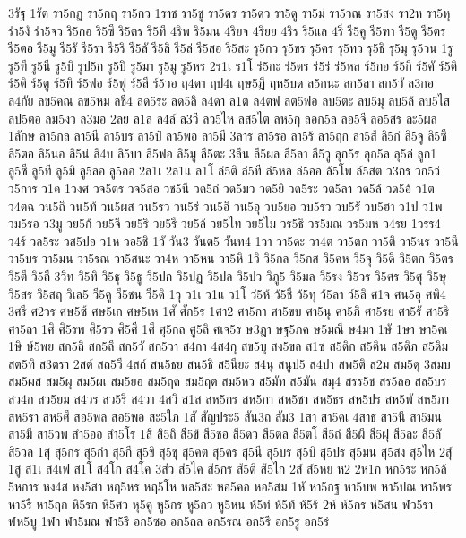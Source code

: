 {3รัฐ
1รัต
รา5กฏ
รา5กฤ
รา5กว
1ราช
รา5ชู
รา5ดร
รา5ดว
รา5ดู
รา5ม่
รา5วณ
รา5สง
รา2ห
รา5หุ
รำ5งั
รำ5จว
ริ5กอ
ริ5ซึ
ริ5ตร
ริ5ทึ
4ริพ
ริ5มน
4ริยจ
4ริยย
4ริร
ริ5แล
4ริ่
รี5คู
รี5ฑา
รี5ดู
รี5ตร
รี5ตอ
รี5มู
รี5รั
รี5รา
รี5ริ
รี5ลั
รี5ลิ
รี5ล่
รี5สอ
รี5สะ
รุ5กว
รุ5ขร
รุ5คร
รุ5ทว
รุ5ธิ
รุ5มุ
รุ5วน
1รู
รู5ที
รู5นี
รู5บิ
รูป5ก
รู5ปิ
รู5มา
รู5มู
รู5หร
2ร1เ
ร1โ
ร่5กะ
ร่5ตร
ร่5ร่
ร่5หล
ร์5กอ
ร์5กี
ร์5คั
ร์5ดิ
ร์5ติ
ร์5ตู
ร์5ทิ
ร์5ฟอ
ร์5ฟู
ร์5ลี
ร์5วอ
ฤ4ดา
ฤป4เ
ฤษ5ฎี
ฤห5บด
ล5กนะ
ลก5ลา
ลก5วั
ล3กอ
ล4กัย
ลข5คณ
ลข5หม
ลชี4
ลด5ระ
ลด5ลิ
ล4ดา
ล1ต
ล4ตฟ
ลต5ฟอ
ลบ5ตะ
ลบ5มุ
ลบ5ล้
ลบ5ไส
ลป5ตอ
ลม5งว
ล3มอ
2ลย
ล1ล
ล4ล์
ล3วี
ลว5ไห
ลส5ไต
ลห5กุ
ลอก5ล
ลอ5จี
ลอ5สร
ละ5ผล
1ลักษ
ลา5กล
ลา5นี
ลา5บร
ลา5ป๋
ลา5พอ
ลา5มี
3ลาร
ลา5รอ
ลา5ร้
ลา5ฤก
ลา5ส้
ลิ5ก่
ลิ5จู
ลิ5ซึ
ลิ5ตอ
ลิ5นอ
ลิ5น่
ลิ4บ
ลิ5บา
ลิ5ฟอ
ลิ5มู
ลี5ตะ
3ลีน
ลี5ผล
ลี5ลา
ลี5วู
ลุก5ร
ลุก5ล
ลุ5ล่
ลูก1
ลู5ซี
ลู5ที
ลู5มิ
ลู5ลอ
ลู5ออ
2ล1เ
2ล1แ
ล1โ
ล่5ติ
ล่5ที
ล่5หล
ล่5ออ
ล้5โพ
ล์5สต
ว3กร
วก5ว่
ว5การ
ว1ค
1วงศ
วจ5ตร
วจ5สอ
วช5นี
วด5ถ่
วด5มว
วด5ยิ
วด5ระ
วด5ลา
วด5ล้
วด5อ้
ว1ต
ว4ตฉ
วน5ถี
วน5ท้
วน5ผส
วน5รว
วน5ร่
วน5อิ
วน5อุ
วบ5ยอ
วบ5รว
วบ5รั
วบ5ฮา
ว1ป
ว1พ
วม5รอ
ว3มู
วย5ก้
วย5จี
วย5ริ
วย5รื
วย5ล้
วย5ไท
วย5ไม
วร5ธิ
วร5มณ
วร5มห
ว4รย
1วรร4
ว4ร์
วล5ระ
วส5ปอ
ว1ห
วอ5ชิ
1วั
วัน3
วันต5
วันท4
1วา
วา5ดะ
วา4ต
วา5ตก
วา5ติ
วา5นร
วา5นึ
วา5บร
วา5มน
วา5รณ
วา5สนะ
วา4ห
วา5หน
วา5หิ
1วิ
วิ5กล
วิ5กส
วิ5คห
วิ5จุ
วิ5ดี
วิ5ตก
วิ5ตร
วิ5ตี
วิ5ถี
3วิท
วิ5ทิ
วิ5ธุ
วิ5ธู
วิ5ปก
วิ5ปฏ
วิ5ปล
วิ5ปว
วิภู5
วิ5มล
วิ5รง
วิ5วร
วิ5ศร
วิ5ศุ
วิ5ษุ
วิ5สร
วิ5สฤ
วิเล5
วี5คู
วี5ชน
วี5ดิ
1วุ
ว1เ
ว1แ
ว1โ
ว่5ห้
ว้5ชื
ว้5ทุ
ว้5ลา
ว์5ลิ
ศ1จ
ศน5อุ
ศพิ4
3ศรี
ศ2วร
ศษ5ซ้
ศษ5เก
ศษ5เห
1ศั
ศัก5ร
1ศา2
ศา5กา
ศา5ขบ
ศา5นุ
ศา5ภิ
ศา5รย
ศา5รั
ศา5ริ
ศา5ลา
1ศิ
ศิ5รพ
ศิ5รว
ศิ5ศี
1ศึ
ศุ5กล
ศู5ลิ
ศเจ5ร
ษ3ฎา
ษฐ5ภค
ษ5มณี
ษ4มา
1ษั
1ษา
ษา5คเ
1ษิ
ษ์5พย
สก5ลิ
สก5ลึ
สก5วั
สก5วา
ส4กา
4ส4กุ
สข5บุ
สง5ขล
ส1ซ
ส5ดิก
ส5ดิน
ส5ดิภ
ส5ดิม
สต5ทิ
ส3ตรา
2สต์
สถ5วี
4สถ์
สน5ธย
สน5ธิ
ส5นียะ
ส4นุ
สนูป5
ส4ปา
สพ5ติ
ส2ม
สม5ดุ
3สมบ
สม5ผส
สม5ผุ
สม5ผเ
สม5ยอ
สม5ฤด
สม5ฤต
สม5หว
ส5มัท
ส5มัน
สมุ4
สรร5ช
สร5ลอ
สล5บร
สว4ก
สว5ยม
ส4วร
สว5ริ
ส4วา
4สวิ
ส1ส
สห5กร
สห5กา
สห5ชา
สห5ธร
สห5ปร
สห5พั
สห5ภา
สห5รา
สห5ศึ
สอ5พล
สอ5พอ
สะ5ใภ
1สั
สัญประ5
สัน3ถ
สัม3
1สา
สา5คเ
4สาธ
สา5นึ
สา5มน
สา5มี
สา5วพ
สำ5ออ
สำ5โร
1สิ
สิ5ถิ
สี5ข้
สี5ชอ
สี5ดว
สี5ตล
สี5ตโ
สี5ถ่
สี5ผึ
สี5ฝุ
สี5ละ
สี5ลั
สี5วล
1สุ
สุ5กร
สุ5กำ
สุ5กี
สุ5ขิ
สุ5ขุ
สุ5คต
สุ5คร
สุ5นี
สุ5บร
สุ5บิ
สุ5ปร
สุ5มน
สุ5สง
สุ5ไห
2สุ์
1สู
ส1เ
ส4เฟ
ส1โ
ส4โก
ส4โค
3ส่ว
ส่5ไค
ส้5กร
ส้5ติ
ส้5ไก
2ส์
ส์5หย
ห2
2ห1ก
หก5ระ
หก5ล้
5หการ
หง4ส
หง5สา
หฤ5หร
หฤ5โห
หล5สะ
หอ5คอ
หอ5สม
1หั
หา5กฐ
หา5บพ
หา5ปณ
หา5พร
หา5รื
หา5ฤก
หิ5รก
หิ5ศว
หุ5คู
หู5กร
หู5กว
หู5หน
ห้5ท่
ห้5ท้
ห้5ร้
2ห์
ห์5กร
ห์5สน
ฬว5รา
ฬห5บู
1ฬา
ฬา5มณ
ฬา5รึ
อก5ซอ
อก5ถล
อก5รณ
อก5รี
อก5รู
อก5ร่
}
